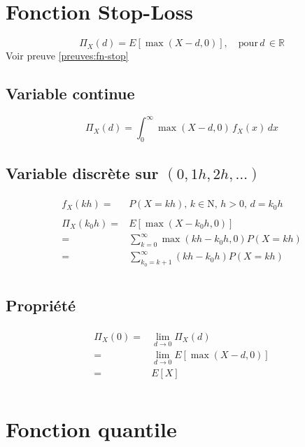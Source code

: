 \documentclass[]{book}
\theoremstyle{definition}
\theoremstyle{definition}
\theoremstyle{definition}
\theoremstyle{remark}
\begin{document}
\section{Fonction Stop-Loss}\label{intro:fn-stop}

\[
    \Pi_X(d) = E\left[\max(X-d,0)\right],\quad\text{pour}\,d \,\in \mathbb{R}
\] Voir preuve \ref{preuves:fn-stop}

\subsection{Variable continue}\label{variable-continue}

\[
    \Pi_X(d) = \int_0^\infty \max(X-d, 0)\,f_X(x)\,dx
\]

\subsection{\texorpdfstring{Variable discrète sur
\(({0,1h,2h,\dots})\)}{Variable discrète sur (\{0,1h,2h,\textbackslash{}dots\})}}\label{variable-discrete-sur-01h2hdots}

\begin{gather*}
\begin{align*}
f_X(kh) =& P(X=kh),\, k\in \mathrm{N},\, h > 0,\, d =k_0 h\\
\\
\Pi_X(k_0 h) =& E[\max(X-k_0 h, 0)]\\
=&\sum_{k=0}^\infty \max(kh-k_0 h, 0) P(X=kh)\\
=&\sum_{k_0=k+1}^\infty (kh-k_0 h) P(X=kh)\\
\end{align*}
\end{gather*}

\subsection{Propriété}\label{propriete}

\begin{gather*}
\begin{align*}
\Pi_X(0) =& \lim_{d \to 0} \Pi_X(d)\\
=& \lim_{d \to 0} E[\max(X-d, 0)]\\
=& E[X] \\
\end{align*}
\end{gather*}

\section{Fonction quantile}\label{intro:fn-quantile}
\end{document}
